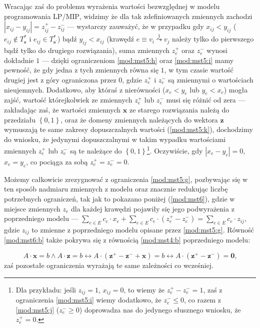 Wracając zaś do problemu wyrażenia wartości bezwzględnej w modelu programowania \textsc{LP}/\textsc{MIP}, widzimy że dla tak zdefiniowanych zmiennych zachodzi $\left| x_{ij} - y_{ij} \right| = z_{ij}^{+} - z_{ij}^{-}$ --- wystarczy zauważyć, że w przypadku gdy $x_{ij} < y_{ij}$ ($e_{ij} \notin T^{\ast}_{\textbf{s}}$ i $e_{ij} \in T^{\ast}_{\textbf{s}^{\prime}}$) bądź $y_{ij} < x_{ij}$ (krawędź $e \equiv v_{i} \overset{1}{\leadsto} v_{j}$ należy tylko do pierwszego bądź tylko do drugiego rozwiązania), suma zmiennych $z_{e}^{+}$ oraz $z_{e}^{-}$ wynosi dokładnie $1$ --- dzięki ograniczeniom \ref{mod:mst5:h} oraz \ref{mod:mst5:i} mamy pewność, że gdy jedna z tych zmiennych równa się $1$, w tym czasie wartość drugiej jest z góry ograniczona przez $0$, gdzie $z^{+}_{e}$ i $z^{-}_{e}$ są zmiennymi o wartościach nieujemnych. Dodatkowo, aby któraś z nierówności ($x_{e} < y_{e}$ lub $y_{e} < x_{e}$) mogła zajść, wartość którejkolwiek ze zmiennych $z_{e}^{+}$ lub $z_{e}^{-}$ musi się różnić od zera --- zakładając zaś, że wartości zmiennych $\textbf{x}$ ze starego rozwiązania należą do przedziału $\left\{ 0 , 1 \right\}$, oraz że domeny zmiennych należących do wektora $\textbf{z}$ wymuszają te same zakresy dopuszczalnych wartości (\ref{mod:mst5:k}), dochodzimy do wniosku, że jedynymi dopuszczalnymi w takim wypadku wartościami zmiennych $z_{e}^{+}$ lub $z_{e}^{-}$ są te należące do $\left\{ 0, 1 \right\}$\footnote{Dla przykładu: jeśli $z_{ij} = 1$, $x_{ij} = 0$, to wiemy że $z_{e}^{+} - z_{e}^{-} = 1$, zaś z ograniczenia \ref{mod:mst5:i} wiemy dodatkowo, że $z_{e}^{-} \leqslant 0$, co razem z \ref{mod:mst5:j} ($z_{e}^{-} \geqslant 0$) doprowadza nas do jedynego słusznego wniosku, że $z_{e}^{+} = 0$.}. Oczywiście, gdy $\left| x_{e} - y_{e} \right| = 0$, $x_{e} = y_{e}$, co pociąga za sobą $z_{e}^{+} = z_{e}^{-} = 0$.

Możemy całkowicie zrezygnować z ograniczenia \ref{mod:mst5:g}, pozbywając się w ten sposób nadmiaru zmiennych z modelu oraz znacznie redukując liczbę potrzebnych ograniczeń, tak jak to pokazano poniżej (\ref{mod:mst6}), gdzie w miejsce zmiennych $z_{e}$ dla każdej krawędzi pojawiły się jego podwyrażenia z poprzedniego modelu --- $\sum_{e \in E} c_{e} \cdot x_{e} + \sum_{e \in E} c_{e} \cdot \left( z^{+}_{e} - z^{-}_{e} \right) = \sum_{e \in E} c_{e} \cdot z_{ij}$, gdzie $z_{ij}$ to zmienne z poprzedniego modelu opisane przez \ref{mod:mst5:g}. Równość \ref{mod:mst6:b} także pokrywa się z równością \ref{mod:mst4:b} poprzedniego modelu:

\begin{equation}
	A \cdot \textbf{x} = b \wedge A \cdot \textbf{z} = b \leftrightarrow A \cdot \left( \textbf{z}^{+} - \textbf{z}^{-} + \textbf{x} \right) = b \leftrightarrow A \cdot  \left( \textbf{z}^{+} - \textbf{z}^{-} \right) = \textbf{0}\text{,}
\end{equation}
zaś pozostałe ograniczenia wyrażają te same zależności co wcześniej.

